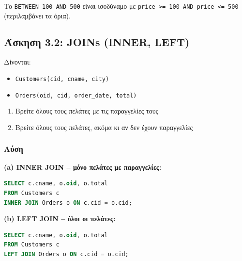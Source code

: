 \begin{infobox}[BETWEEN]
Το \texttt{BETWEEN 100 AND 500} είναι ισοδύναμο με \texttt{price >= 100 AND price <= 500}
(περιλαμβάνει τα όρια).
\end{infobox}

\subsection{Άσκηση 3.2: JOINs (INNER, LEFT)}

\begin{formulabox}[Εκφώνηση]
Δίνονται:
\begin{itemize}
    \item \texttt{Customers(cid, cname, city)}
    \item \texttt{Orders(oid, cid, order\_date, total)}
\end{itemize}

\begin{enumerate}
    \item Βρείτε όλους τους πελάτες με τις παραγγελίες τους
    \item Βρείτε όλους τους πελάτες, ακόμα κι αν δεν έχουν παραγγελίες
\end{enumerate}
\end{formulabox}

\subsubsection*{Λύση}

\textbf{(a) INNER JOIN -- μόνο πελάτες με παραγγελίες:}

\begin{lstlisting}[language=SQL]
SELECT c.cname, o.oid, o.total
FROM Customers c
INNER JOIN Orders o ON c.cid = o.cid;
\end{lstlisting}

\textbf{(b) LEFT JOIN -- όλοι οι πελάτες:}

\begin{lstlisting}[language=SQL]
SELECT c.cname, o.oid, o.total
FROM Customers c
LEFT JOIN Orders o ON c.cid = o.cid;
\end{lstlisting}

